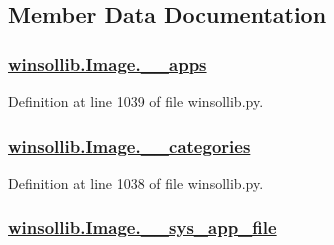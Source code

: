 \subsection{Member Data Documentation}
\hypertarget{classwinsollib_1_1Image_bdf9339b698fcc8a571125ceac76f58d}{
\subsubsection[\_\-\_\-apps]{\setlength{\rightskip}{0pt plus 5cm}\hyperlink{classwinsollib_1_1Image_bdf9339b698fcc8a571125ceac76f58d}{winsollib.Image.\_\-\_\-apps}}}
\label{classwinsollib_1_1Image_bdf9339b698fcc8a571125ceac76f58d}




Definition at line 1039 of file winsollib.py.\hypertarget{classwinsollib_1_1Image_c9cd5bdcffbf6898df5aa724da65e8d6}{
\subsubsection[\_\-\_\-categories]{\setlength{\rightskip}{0pt plus 5cm}\hyperlink{classwinsollib_1_1Image_c9cd5bdcffbf6898df5aa724da65e8d6}{winsollib.Image.\_\-\_\-categories}}}
\label{classwinsollib_1_1Image_c9cd5bdcffbf6898df5aa724da65e8d6}




Definition at line 1038 of file winsollib.py.\hypertarget{classwinsollib_1_1Image_4fd20c6fef2a4868a20e50376bfbef9d}{
\subsubsection[\_\-\_\-sys\_\-app\_\-file]{\setlength{\rightskip}{0pt plus 5cm}\hyperlink{classwinsollib_1_1Image_4fd20c6fef2a4868a20e50376bfbef9d}{winsollib.Image.\_\-\_\-sys\_\-app\_\-file}}}
\label{classwinsollib_1_1Image_4fd20c6fef2a4868a20e50376bfbef9d}




